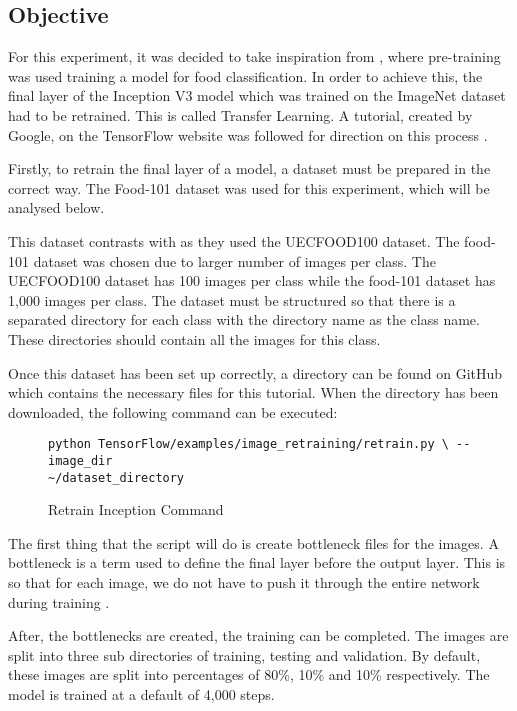 \tocless\subsection{Objective}
For this experiment, it was decided to take inspiration from
\parencite{yanaiFood}, where pre-training was used training a model for food
classification. In order to achieve this, the final layer of the
Inception V3 model which was trained on the ImageNet dataset had to be retrained. This is called
Transfer Learning.
A tutorial, created by Google, on the TensorFlow website was followed
for direction on this process \parencite{retrainInception}.

Firstly, to retrain the final layer of a model, a dataset must be
prepared in the correct way. The Food-101 dataset \parencite{food101}
was used for this experiment, which will be analysed below.

This dataset contrasts with \parencite{yanaiFood} as they used the UECFOOD100 dataset.
The food-101 dataset was chosen due to larger number of images per class.
The UECFOOD100 dataset has 100 images per class while the food-101 dataset has 1,000 images per class.
The dataset must be structured so that
there is a separated directory for each class with the directory name as the class
name. These directories should contain all the images for this class. 

Once this dataset has been set up correctly, a directory can be found on GitHub
which contains the necessary files for this tutorial. When the directory has
been downloaded, the following command can be executed:
\begin{figure}
\caption{Retrain Inception Command}
\label{lst:retrainCommand}
\begin{lstlisting}[style=Command]
python TensorFlow/examples/image_retraining/retrain.py \ --image_dir
~/dataset_directory
\end{lstlisting}
\end{figure}

The first thing that the script will do is create bottleneck files for the
images. A bottleneck is a term used to define the final layer before the output
layer. This is so that for each image, we do not have to push it through the
entire network during training \parencite{retrainInception}.

After, the bottlenecks are created, the training can be completed. The images
are split into three sub directories of training, testing and validation. By
default, these images are split into percentages of 80\%, 10\% and 10\%
respectively. The model is trained at a default of 4,000 steps. 

